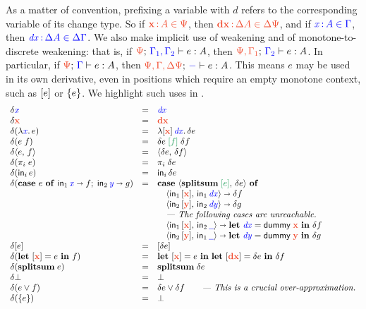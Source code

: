 \documentclass{article}
\theoremstyle{plain}
\theoremstyle{definition}
\newcommand{\dummy}{\ms{dummy}}
\newcommand{\preserve}[1]{{\color{ForestGreen}{#1}}}
\newcommand{\preservedisc}[1]{\preserve{\disc{#1}}}
\newcommand{\comment}[1]{\textit{--- {#1}}}
\begin{document}
As a matter of convention, prefixing a variable with $d$ refers to the corresponding variable of its change type.
%
So if $\dt{\d{x} \of A \in \GP}$, then $\dt{\d{dx} \of \Ch A \in \Ch \GP}$, and if ${\color{blue}{\ensuremath{\mathit{{\color{blue}{x}}}} \,{:}\,A \in \Gamma}}$, then ${\color{blue}{\ensuremath{\mathit{{\color{blue}{dx}}}} \,{:}\,\Delta A \in \Delta\Gamma}}$.
%
We also make implicit use of weakening and of monotone-to-discrete weakening: that is, if $\J{\GP}{\GG_1,\GG_2}{e}{A}$, then $\J{\GP,\GG_1}{\GG_2}{e}{A}$.
%
In particular, if $\J{\GP}{\GG}{e}{A}$, then $\J{\GP,\GG,\Ch\GP}{-}{e}{A}$.
%
This means $e$ may be used in its own derivative, even in positions which require an empty monotone context, such as $[{e}]$ or $\{{e}\}$.
%
We highlight such uses in \preserve{green}.
%
\[
\begin{array}{lcll}
  \delta \m{x} &=& \m{dx}\\
  \delta \d{x} &=& \d{dx}\\
  \delta(\lam{\m{x}} e) &=&
  \lam{\disc{\d{x}} \, \m{dx}} \delta e\\
  \delta(e\;f) &=& \delta e \; \preservedisc{f} \; \delta f\\
  \delta \pair{e}{f} &=& \pair{\delta{e}}{\delta{f}}\\
  \delta(\pi_i\; e) &=& \pi_i\; \delta{e}\\
  \delta(\inj{i}{e}) &=& \inj{i}{\delta{e}}\\

  \delta(\case{e}{\m x}{f}{\m y}{g})
  &=& \mb{case}~ \pair{\splitsum{\preservedisc{e}}}{\delta e} ~\mb{of}\\
   && \quad \pair{\inj{1}{\disc{\d{x}}}}{\inj{1}{\m{dx}}} \cto \delta f\\
   && \quad \pair{\inj{2}{\disc{\d{y}}}}{\inj{2}{\m{dy}}} \cto \delta g\\
   && \quad \comment{The following cases are unreachable.}\\
   && \quad \pair{\inj{1}{\disc{\d{x}}}}{\inj{2}{\m{\pwild}}} \cto
      \letv{\m{dx}}{\dummy\; \d{x}} \delta f\\
   && \quad \pair{\inj{2}{\disc{\d{y}}}}{\inj{1}{\m{\pwild}}} \cto
      \letv{\m{dy}}{\dummy\; \d{y}} \delta g\\

  \delta\disc{e} &=& \disc{\delta e}\\
  \delta(\letdisc{\d{x}}{e} f) &=&
    \letdisc{\d{x}}{e} \letdisc{\d{dx}}{\delta e} \delta f\\

  \delta(\splitsum{e}) &=&
  \splitsum{\delta e}\\
  \delta \unit &=& \unit\\
  \delta(e \vee f) &=& \delta e \vee \delta f
  \qquad \comment{This is a crucial over-approximation.}\\
  \delta(\single{e}) &=& \unit\\


\end{array}\]
\end{document}
